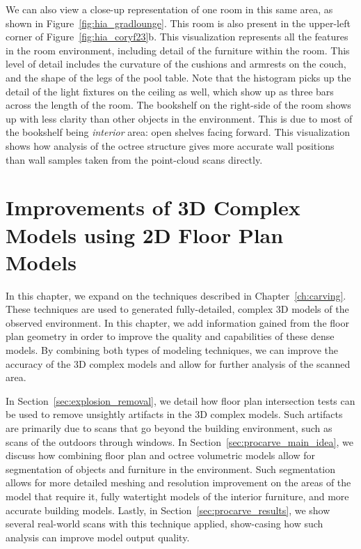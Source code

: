 \documentclass[12pt,onecolumn,oneside]{book}
\begin{document}
We can also view a close-up representation of one room in this same area, as shown in Figure~\ref{fig:hia_gradlounge}.  This room is also present in the upper-left corner of Figure~\ref{fig:hia_coryf23}b.  This visualization represents all the features in the room environment, including detail of the furniture within the room.  This level of detail includes the curvature of the cushions and armrests on the couch, and the shape of the legs of the pool table.  Note that the histogram picks up the detail of the light fixtures on the ceiling as well, which show up as three bars across the length of the room.  The bookshelf on the right-side of the room shows up with less clarity than other objects in the environment.  This is due to most of the bookshelf being {\it interior} area: open shelves facing forward.  This visualization shows how analysis of the octree structure gives more accurate wall positions than wall samples taken from the point-cloud scans directly.


\chapter{Improvements of 3D Complex Models using 2D Floor Plan Models}
\label{ch:better_carving}

In this chapter, we expand on the techniques described in Chapter~\ref{ch:carving}.  These techniques are used to generated fully-detailed, complex 3D models of the observed environment.  In this chapter, we add information gained from the floor plan geometry in order to improve the quality and capabilities of these dense models.  By combining both types of modeling techniques, we can improve the accuracy of the 3D complex models and allow for further analysis of the scanned area.

In Section~\ref{sec:explosion_removal}, we detail how floor plan intersection tests can be used to remove unsightly artifacts in the 3D complex models.  Such artifacts are primarily due to scans that go beyond the building environment, such as scans of the outdoors through windows.  In Section~\ref{sec:procarve_main_idea}, we discuss how combining floor plan and octree volumetric models allow for segmentation of objects and furniture in the environment.  Such segmentation allows for more detailed meshing and resolution improvement on the areas of the model that require it, fully watertight models of the interior furniture, and more accurate building models.  Lastly, in Section~\ref{sec:procarve_results}, we show several real-world scans with this technique applied, show-casing how such analysis can improve model output quality.
\end{document}
